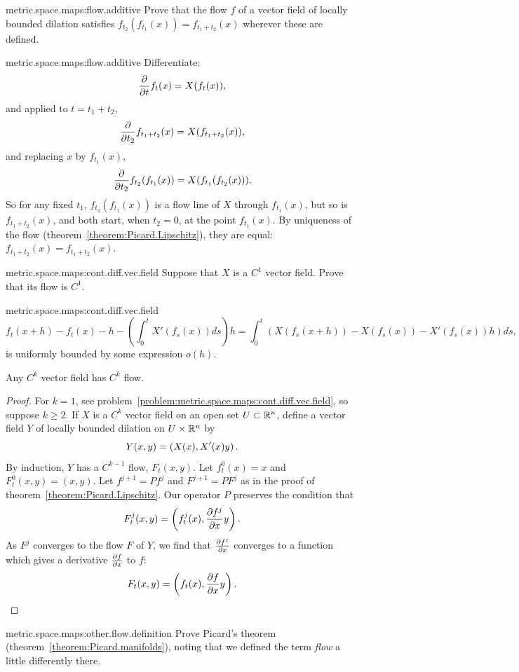 \begin{problem}{metric.space.maps:flow.additive}
Prove that the flow \(f\) of a vector field of locally bounded dilation satisfies \(f_{t_2}(f_{t_1}(x))=f_{t_1+t_2}(x)\) wherever these are defined.
\end{problem}
\begin{answer}{metric.space.maps:flow.additive}
Differentiate:
\[
\frac{\partial }{\partial t}f_t(x)=X(f_t(x)),
\]
and applied to \(t=t_1+t_2\),
\[
\frac{\partial }{\partial t_2}f_{t_1+t_2}(x)=X(f_{t_1+t_2}(x)),
\]
and replacing \(x\) by \(f_{t_1}(x)\),
\[
\frac{\partial }{\partial t_2}f_{t_2}(f_{t_1}(x))=X(f_{t_1}(f_{t_2}(x))).
\]
So for any fixed \(t_1\), \(f_{t_2}(f_{t_1}(x))\) is a flow line of \(X\) through \(f_{t_1}(x)\), but so is \(f_{t_1+t_2}(x)\), and both start, when \(t_2=0\), at the point \(f_{t_1}(x)\).
By uniqueness of the flow (theorem~\vref{theorem:Picard.Lipschitz}), they are equal: \(f_{t_1+t_2}(x)=f_{t_1+t_2}(x)\).
\end{answer}
\begin{problem}{metric.space.maps:cont.diff.vec.field}
Suppose that \(X\) is a \(C^1\) vector field.
Prove that its flow is \(C^1\).
\end{problem}
\begin{answer}{metric.space.maps:cont.diff.vec.field}
\[
f_t(x+h)-f_t(x)-h
-
\left(
\int_0^t X'(f_s(x))ds
\right)
h
=
\int_0^t(X(f_s(x+h))-X(f_s(x))-X'(f_s(x))h)ds,
\]
is uniformly bounded by some expression \(o(h)\).
\end{answer}
\begin{theorem}
Any \(C^k\) vector field has \(C^k\) flow.
\end{theorem}
\begin{proof}
For \(k=1\), see problem~\ref{problem:metric.space.maps:cont.diff.vec.field}, so suppose \(k\ge 2\).
If \(X\) is a \(C^k\) vector field on an open set \(U \subset \mathbb{R}^{n}\), define a vector field \(Y\) of locally bounded dilation on \(U \times \mathbb{R}^{n}\) by
\[
Y(x,y)=\left(X(x),X'(x)y\right).
\]
By induction, \(Y\) has a \(C^{k-1}\) flow, \(F_t(x,y)\).
Let \(f^0_t(x)=x\) and \(F^0_t(x,y)=(x,y)\).
Let \(f^{j+1}=Pf^j\) and \(F^{j+1}=PF^j\) as in the proof of theorem~\vref{theorem:Picard.Lipschitz}.
Our operator \(P\) preserves the condition that 
\[
F^j_t(x,y)=\left(f^j_t(x),\frac{\partial f^j}{\partial x}y\right).
\]
As \(F^j\) converges to the flow \(F\) of \(Y\), we find that \(\frac{\partial f^j}{\partial x}\) converges to a function which gives a derivative \(\frac{\partial f}{\partial x}\) to \(f\):
\[
F_t(x,y)=\left(f_t(x),\frac{\partial f}{\partial x}y\right).
\]
\end{proof}
\begin{problem}{metric.space.maps:other.flow.definition}
Prove Picard's theorem (theorem~\vref{theorem:Picard.manifolds}), noting that we defined the term \emph{flow} a little differently there.
\end{problem}
